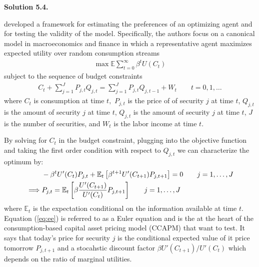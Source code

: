 \documentclass[11pt]{article}
\newenvironment{solution}[1]
    {\bigskip\noindent\textbf{Solution #1.} \par}
    {\medskip}
\newcommand{\ev}{\mathbb{E}}
\begin{document}
\begin{solution}{5.4}

\cite{hs1982gmm} developed a framework for estimating the preferences of an optimizing agent and for testing the validity of the model. Specifically, the authors focus on a canonical model in macroeconomics and finance in which a representative agent maximizes expected utility over random consumption streams
\begin{align*}
    \max \ev \sum_{t=0}^\infty \beta^t U(C_t)
\end{align*}
subject to the sequence of budget constraints
\begin{align*}
    C_t + \sum_{j=1}^J P_{j,t} Q_{j,t} = \sum_{j=1}^J P_{j,t}Q_{j,t-1} +W_t \qquad t=0,1,\ldots
\end{align*}
where $C_t$ is consumption at time $t,$ $P_{j,t}$ is the price of of security $j$ at time $t$, $Q_{j,t}$ is the amount of security $j$ at time $t$, $Q_{j,t}$ is the amount of security $j$ at time $t$, $J$ is the number of securities, and $W_t$ is the labor income at time $t.$


By solving for $C_t$ in the budget constraint, plugging into the objective function and taking the first order condition with respect to $Q_{j,t}$ we can characterize the optimum by:
\begin{align}
    &-\beta^t U'(C_t)P_{j,t} + \ev_{t}\left[\beta^{t+1}U'(C_{t+1})P_{j,t+1}\right] = 0 \qquad j= 1, \ldots, J \notag \\
    \implies &P_{j,t} = \ev_t\left[\beta\frac{U'(C_{t+1})}{U'(C_t)} P_{j,t+1}\right] \qquad j= 1, \ldots, J \label{eq:ee}
\end{align}
where $\ev_t$ is the expectation conditional on the information available at time $t.$ Equation (\ref{eq:ee}) is referred to as a Euler equation and is the at the heart of the consumption-based capital asset pricing model (CCAPM) that \cite{hs1982gmm} want to test. It says that today's price for security $j$ is the conditional expected value of it price tomorrow $P_{j,t+1}$ and a stocahstic discount factor $\beta U'(C_{t+1})/U'(C_t)$ which depends on the ratio of marginal utilities. 


\end{solution}
\end{document}
